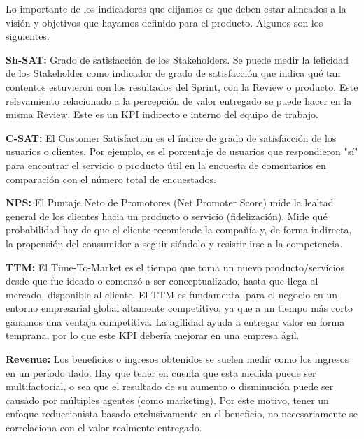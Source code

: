 Lo importante de los indicadores que elijamos es que deben estar alineados a la visión y objetivos que hayamos definido para el producto.
Algunos son los siguientes.



  \begin{description}
 
  \item {\textbf{Sh-SAT:} Grado de satisfacción de los Stakeholders. Se puede medir la felicidad de los Stakeholder como indicador de grado de satisfacción que indica qué tan contentos estuvieron con los resultados del Sprint, con la Review o producto. Este relevamiento relacionado a la percepción de valor entregado se puede hacer en la misma Review. Este es un KPI indirecto e interno del equipo de trabajo.
}

  \item {\textbf{C-SAT:} El Customer Satisfaction es el índice de grado de satisfacción de los usuarios o clientes. Por ejemplo, es el porcentaje de usuarios que respondieron "sí" para encontrar el servicio o producto útil en la encuesta de comentarios en comparación con el número total de encuestados.
}

  \item {\textbf{NPS:} El Puntaje Neto de Promotores (Net Promoter Score) mide la lealtad general de los clientes hacia un producto o servicio (fidelización). Mide qué probabilidad hay de que el cliente recomiende la compañía y, de forma indirecta, la propensión del consumidor a seguir siéndolo y resistir irse a la competencia.
}

  \item {\textbf{TTM:} El Time-To-Market es el tiempo que toma un nuevo producto/servicios desde que fue ideado o comenzó a ser conceptualizado, hasta que llega al mercado, disponible al cliente. El TTM es fundamental para el negocio en un entorno empresarial global altamente competitivo, ya que a un tiempo más corto ganamos una ventaja competitiva. La agilidad ayuda a entregar valor en forma temprana, por lo que este KPI debería mejorar en una empresa ágil.
}

  \item {\textbf{Revenue:} Los beneficios o ingresos obtenidos se suelen medir como los ingresos en un periodo dado. Hay que tener en cuenta que esta medida puede ser multifactorial, o sea que el resultado de su aumento o disminución puede ser causado por múltiples agentes (como marketing). Por este motivo, tener un enfoque reduccionista basado exclusivamente en el beneficio, no necesariamente se correlaciona con el valor realmente entregado.
}


\end{description}
